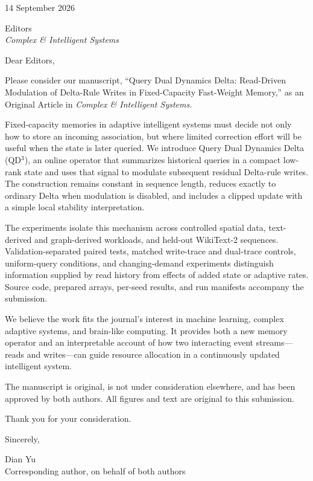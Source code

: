 \documentclass[11pt,a4paper]{article}
\begin{document}
14 September 2026

Editors\\
\textit{Complex \& Intelligent Systems}

Dear Editors,

Please consider our manuscript, ``Query Dual Dynamics Delta: Read-Driven Modulation of Delta-Rule Writes in Fixed-Capacity Fast-Weight Memory,'' as an Original Article in \textit{Complex \& Intelligent Systems}.

Fixed-capacity memories in adaptive intelligent systems must decide not only how to store an incoming association, but where limited correction effort will be useful when the state is later queried. We introduce Query Dual Dynamics Delta (QD$^3$), an online operator that summarizes historical queries in a compact low-rank state and uses that signal to modulate subsequent residual Delta-rule writes. The construction remains constant in sequence length, reduces exactly to ordinary Delta when modulation is disabled, and includes a clipped update with a simple local stability interpretation.

The experiments isolate this mechanism across controlled spatial data, text-derived and graph-derived workloads, and held-out WikiText-2 sequences. Validation-separated paired tests, matched write-trace and dual-trace controls, uniform-query conditions, and changing-demand experiments distinguish information supplied by read history from effects of added state or adaptive rates. Source code, prepared arrays, per-seed results, and run manifests accompany the submission.

We believe the work fits the journal's interest in machine learning, complex adaptive systems, and brain-like computing. It provides both a new memory operator and an interpretable account of how two interacting event streams---reads and writes---can guide resource allocation in a continuously updated intelligent system.

The manuscript is original, is not under consideration elsewhere, and has been approved by both authors. All figures and text are original to this submission.

Thank you for your consideration.

Sincerely,

Dian Yu\\
Corresponding author, on behalf of both authors
\end{document}

